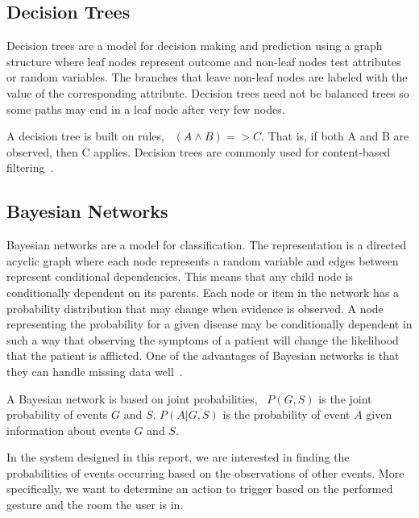 
\subsection{Decision Trees}
\label{sec:analysis:recommender-methods:decision-trees}

Decision trees are a model for decision making and prediction using a graph structure where leaf nodes represent outcome and non-leaf nodes test attributes or random variables.
The branches that leave non-leaf nodes are labeled with the value of the corresponding attribute.
Decision trees need not be balanced trees so some paths may end in a leaf node after very few nodes.

A decision tree is built on rules, \eg~$(A \wedge B) => C$. That is, if both A and B are observed, then C applies. Decision trees are commonly used for content-based filtering~\cite{adomavicius2005toward}.

\subsection{Bayesian Networks}
\label{sec:analysis:recommender-methods:bayesian-networks}

Bayesian networks are a model for classification. The representation is a directed acyclic graph where each node represents a random variable and edges between represent conditional dependencies.
This means that any child node is conditionally dependent on its parents.
Each node or item in the network has a probability distribution that may change when evidence is observed.
A node representing the probability for a given disease may be conditionally dependent in such a way that observing the symptoms of a patient will change the likelihood that the patient is afflicted.
One of the advantages of Bayesian networks is that they can handle missing data well~\cite{heckerman2008tutorial}. 

A Bayesian network is based on joint probabilities, \eg~$P(G,S)$ is the joint probability of events $G$ and $S$. $P(A|G,S)$ is the probability of event $A$ given information about events $G$ and $S$.

In the system designed in this report, we are interested in finding the probabilities of events occurring based on the observations of other events. More specifically, we want to determine an action to trigger based on the performed gesture and the room the user is in.

